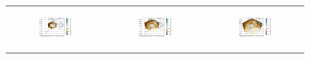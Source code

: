 \begin{figure}[htbp]
    \centering
    \begin{tabular}{ccc}
        \begin{subfigure}[b]{0.33\textwidth}
            \caption{}
            \includegraphics[width=\textwidth]{images/chap4/domain_size/diff_map_precip_era_LAM_1000km_NBP40.png}
        \end{subfigure} &
        \begin{subfigure}[b]{0.33\textwidth}
            \caption{}
            \includegraphics[width=\textwidth]{images/chap4/domain_size/diff_map_precip_era_LAM_1500km_NBP60.png}
        \end{subfigure} &
        \begin{subfigure}[b]{0.33\textwidth}
            \caption{}
            \includegraphics[width=\textwidth]{images/chap4/domain_size/diff_map_precip_era_LAM_2000km_NBP80.png}

\end{subfigure}
\end{tabular}
\end{figure}
